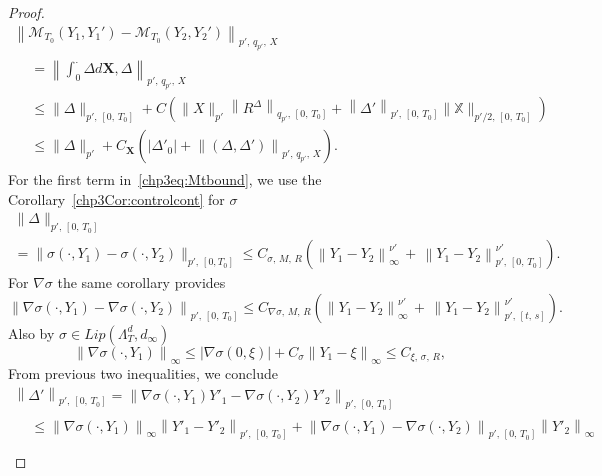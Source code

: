 \documentclass[10pt]{amsart}
\theoremstyle{definition}\newtheorem{defi}[theo]{Definition}\newtheorem{rema}[theo]{Remark}\newtheorem{exam}[theo]{Example}\newtheorem{exem}[theo]{Example}\newtheorem{nota}[theo]{Notation}
\newcommand{\bfX}{\mathbf{X}}
\newcommand{\bbX}{\mathbb{X}}
\newcommand{\calM}{\mathcal{M}}
\begin{document}
\begin{proof}
\begin{multline}\label{chp3eq:Mtbound}
\left\|\calM_{T_0}\left(Y_1,Y_1'\right)-\calM_{T_0}\left(Y_2,Y_2'\right)\right\|_{p',\, q_{p'},\,X}\\
\begin{aligned}
&=\left\|\int_0^{\cdot}\Delta d\bfX, \Delta\right\|_{p',\,q_{p'},\,X}\\
&\leq\|\Delta\|_{p',\,\left[0,\,T_0\right]}+C\left(\|X\|_{p'}\left\|R^{\Delta}\right\|_{q_{p'},\,\left[0,\,T_0\right]}+\left\|\Delta'\right\|_{p',\,\left[0,\,T_0\right]}\|\bbX\|_{p'/2,\,\left[0,\,T_0\right]}\right)\\
&\leq\|\Delta\|_{p'}+C_{\bfX}\left(\left|\Delta'_0\right|+\left\|\left(\Delta,\Delta'\right)\right\|_{p',\,q_{p'},\, X}\right).
\end{aligned}
\end{multline}
For the first term in~\eqref{chp3eq:Mtbound}, we use the Corollary~\ref{chp3Cor:controlcont} for $\sigma$
\begin{multline}\label{chp3eq:Deltanubound}
\|\Delta\|_{p',\,\left[0,\,T_0\right]}\\
=\|{\sigma}\left(\cdot, Y_1\right)-{\sigma}\left(\cdot, Y_2\right)\|_{p',\,\left[0,T_0\right]}
\leq C_{\sigma,\,M,\,R} \left(\left\|Y_1-Y_2\right\|_{\infty}^{\nu'}\,+\,\left\|Y_1-Y_2\right\|_{p',\,\left[0,\,T_0\right]}^{\nu'}\right).
\end{multline}
For $\nabla\sigma$ the same corollary provides
\[
\left\|\nabla{\sigma}\left(\cdot, Y_1\right)-\nabla{\sigma}\left(\cdot, Y_2\right)\right\|_{p',\,\left[0,\,T_0\right]}
\leq C_{\nabla \sigma,\,M,\,R}\left(\left\|Y_1-Y_2\right\|_{\infty}^{\nu'}\,+\,\left\|Y_1-Y_2\right\|_{p',\,[t,\,s]}^{\nu'}\right).
\]
Also by $\sigma\in Lip(\Lambda_T^d, d_{\infty})$
\[
\left\|\nabla\sigma(\cdot, Y_1)\right\|_{\infty} \leq \left|\nabla \sigma(0, \xi)\right| +C_{\sigma}\left\|Y_1-\xi\right\|_{\infty}\le C_{\xi,\,\sigma,\,R},
\]
From previous two inequalities, we conclude
\begin{multline}\label{eq:Deltanu'}
\left\|\Delta'\right\|_{p',\,\left[0,\,T_0\right]}=\left\|\nabla {\sigma}\left(\cdot, Y_1\right)Y'_1-\nabla {\sigma}\left(\cdot, Y_2\right)Y'_2\right\|_{p',\, \left[0,\,T_0\right]}\\
\begin{aligned}
&\leq\left\|\nabla\sigma(\cdot, Y_1)\right\|_{\infty}\left\|Y'_1-Y'_2\right\|_{p',\,\left[0,\,T_0\right]} +\left\|\nabla {\sigma}\left(\cdot, Y_1\right)-\nabla {\sigma}\left(\cdot, Y_2\right)\right\|_{p',\,\left[0,\,T_0\right]}\left\|Y'_2\right\|_{\infty}\\

\end{aligned}
\end{multline}
\end{proof}
\end{document}
